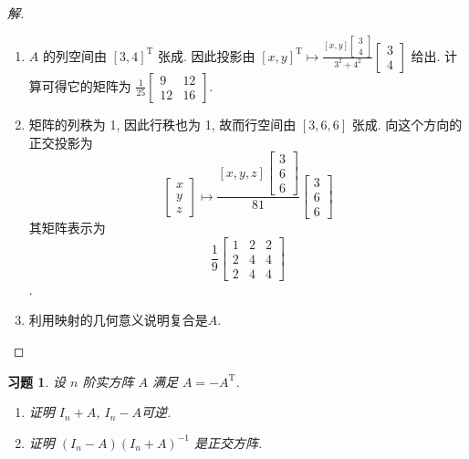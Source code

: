 \documentclass[UTF8]{ctexart}
\newtheorem{ex}[thm]{习题}
\begin{document}
\begin{proof}[解]
  \begin{enumerate}
  \item \(A\) 的列空间由 \([3,4]^{\mathrm{T}}\) 张成.
    因此投影由 \([x,y]^{\mathrm{T}} \mapsto \frac{[x,y]\left[ \begin{smallmatrix} 3 \\ 4\end{smallmatrix} \right]}{3^2+4^2}\left[ \begin{smallmatrix} 3 \\ 4\end{smallmatrix} \right]\)
    给出. 计算可得它的矩阵为 \(\frac{1}{25}\left[\begin{smallmatrix} 9 & 12 \\ 12 & 16\end{smallmatrix} \right]\).
  \item 矩阵的列秩为 1, 因此行秩也为 1, 故而行空间由 \([3,6,6]\)
    张成. 向这个方向的正交投影为
    \begin{equation}
      \begin{bmatrix}
        x \\ y \\ z
      \end{bmatrix}
      \mapsto
      \frac{[x,y,z]\left[
          \begin{smallmatrix}
            3 \\ 6 \\ 6
          \end{smallmatrix}
        \right]}{81}
      \begin{bmatrix}
        3 \\ 6 \\6
      \end{bmatrix}
    \end{equation}
    其矩阵表示为
    \begin{equation*}
      \frac{1}{9}
      \begin{bmatrix}
        1 & 2 & 2 \\ 2 & 4 & 4 \\ 2 &  4 & 4
      \end{bmatrix}
    \end{equation*}.
  \item 利用映射的几何意义说明复合是$A$.
  \end{enumerate}
\end{proof}

\begin{ex}
  设 \(n\) 阶实方阵 \(A\) 满足 \(A = -A^{\mathrm{T}}\).
  \begin{enumerate}
  \item 证明 \(I_{n}+A\), \(I_n-A\)可逆.
  \item 证明 \((I_{n}-A)(I_{n}+A)^{-1}\) 是正交方阵.
  \end{enumerate}
\end{ex}
\end{document}
